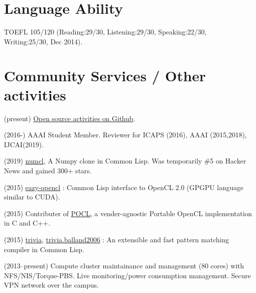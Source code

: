 \documentclass[letterpaper,11pt]{article}
\begin{document}
\section{Language Ability}

\begin{CV}
 \item[English:] TOEFL 105/120 (Reading:29/30, Listening:29/30,
 Speaking:22/30, Writing:25/30, Dec 2014).
\end{CV}

\section{Community Services / Other activities}

(present) \href{https://github.com/guicho271828}{Open source activities on Github}.

(2016-) AAAI Student Member. Reviewer for ICAPS (2016), AAAI (2015,2018), IJCAI(2019).

(2019) \href{https://github.com/numcl/numcl}{numcl},
A Numpy clone in Common Lisp. Was temporarily \#5 on Hacker News and gained 300+ stars.

(2015) \href{https://github.com/guicho271828/eazy-opencl}{eazy-opencl}
: Common Lisp interface to OpenCL 2.0 (GPGPU language similar to CUDA).

(2015) Contributer of \href{https://github.com/pocl/pocl}{POCL},
a vender-agnostic Portable OpenCL implementation in C and C++.

(2015) \href{https://github.com/guicho271828/trivia}{trivia},
\href{https://github.com/guicho271828/trivia.balland2006}{trivia.balland2006}
: An extensible and fast pattern matching compiler in Common Lisp.


(2013--present)
 Compute cluster maintainance and management (80 cores) with NFS/NIS/Torque-PBS.
 Live monitoring/power consumption management.
 Secure VPN network over the campus.

% 
\end{document}
